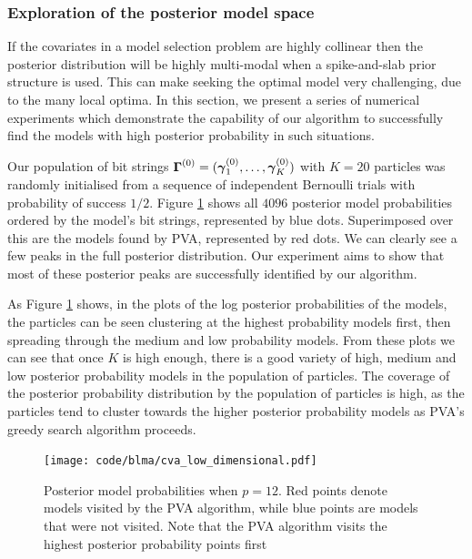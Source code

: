\subsubsection{Exploration of the posterior model space}

If the covariates in a model selection problem are highly collinear then the posterior distribution will be
highly multi-modal when a spike-and-slab prior structure is used. This can make seeking the optimal model very
challenging, due to the many local optima. In this section, we present a series of numerical experiments which
demonstrate the capability of our algorithm to successfully find the models with high posterior probability in
such situations.

Our population of bit strings ${\boldsymbol \Gamma}^{(0)} = ({\boldsymbol \gamma}_1^{(0)}, \ldots, {\boldsymbol \gamma}_K^{(0)})$ with
$K = 20$ particles was randomly initialised from a sequence of independent Bernoulli trials with probability
of success $1/2$.
Figure \ref{fig:PVA_posterior_models} shows all $4096$ posterior model probabilities ordered by the model's
bit strings, represented by blue dots. Superimposed over this are the models found by PVA, represented by
red dots.
We can clearly see a few peaks in the full posterior distribution. Our experiment aims to show
that most of these posterior peaks are successfully identified by our algorithm.

As Figure \ref{fig:PVA_posterior_models} shows, 
in the plots of the log posterior probabilities of the models, the particles can be seen clustering at the
highest probability models first, then spreading through the medium and low probability models. From these
plots we can see that once $K$ is high enough, there is a good variety of high, medium and low posterior
probability models in the population of particles. The coverage of the posterior probability distribution
by the population of particles is high, as the particles tend to cluster towards the higher posterior
probability models as PVA's greedy search algorithm proceeds.


\begin{figure}	
	\texttt{[image: code/blma/cva\_low\_dimensional.pdf]}
	\caption{Posterior model probabilities when $p = 12$. Red points denote models visited by the PVA
						algorithm, while blue points are models that were not visited. Note that the PVA algorithm
						visits the highest posterior probability points first}
	\label{fig:PVA_posterior_models}
\end{figure}

